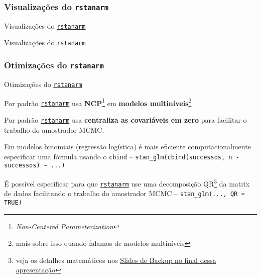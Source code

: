 \subsubsection{Visualizações do \texttt{rstanarm}}
\begin{frame}{Visualizações do \href{http://mc-stan.org/rstanarm/}{\texttt{rstanarm}}}
	\centering
	\begin{figure}
		\resizebox{.45\linewidth}{!}{}
	\end{figure}
\end{frame}

\begin{frame}{Visualizações do \href{http://mc-stan.org/rstanarm/}{\texttt{rstanarm}}}
	\centering
	\begin{figure}
		\resizebox{.45\linewidth}{!}{}
	\end{figure}
\end{frame}

\subsubsection{Otimizações do \texttt{rstanarm}}
\begin{frame}{Otimizações do \href{http://mc-stan.org/rstanarm/}{\texttt{rstanarm}}}
	\begin{vfilleditems}
		\item Por padrão \href{http://mc-stan.org/rstanarm/}{\texttt{rstanarm}}
		usa \textbf{NCP}\footnote{\textit{Non-Centered Parameterization}}
		em \textbf{modelos multiníveis}\footnote{mais sobre isso quando falamos de modelos multiníveis}
		\item Por padrão \href{http://mc-stan.org/rstanarm/}{\texttt{rstanarm}}
		usa \textbf{centraliza as covariáveis em zero} para facilitar o trabalho do amostrador
		MCMC.
		\item Em modelos binomiais (regressão logística) é mais eficiente computacionalmente
		especificar uma fórmula usando o \lstinline!cbind! --
		\lstinline!stan_glm(cbind(successos, n - successos) ~ ...)!
		\item É possível especificar para que \href{http://mc-stan.org/rstanarm/}{\texttt{rstanarm}}
		use uma decomposição QR\footnote{veja os detalhes matemáticos nos \hyperlink{appendixqr}{Slides de Backup no final dessa apresentação}}
		da matrix de dados facilitando o trabalho do amostrador MCMC
		-- \lstinline!stan_glm(..., QR = TRUE)!
	\end{vfilleditems}
\end{frame}

